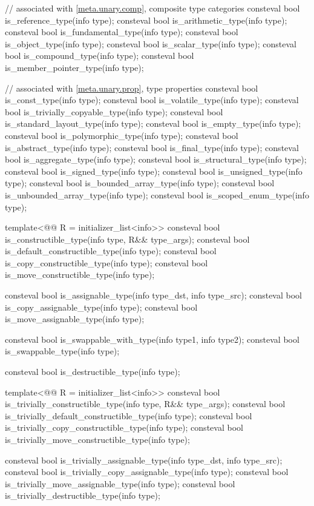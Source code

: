 \begin{codeblock}
{  // associated with \ref{meta.unary.comp}, composite type categories
  consteval bool is_reference_type(info type);
  consteval bool is_arithmetic_type(info type);
  consteval bool is_fundamental_type(info type);
  consteval bool is_object_type(info type);
  consteval bool is_scalar_type(info type);
  consteval bool is_compound_type(info type);
  consteval bool is_member_pointer_type(info type);

  // associated with \ref{meta.unary.prop}, type properties
  consteval bool is_const_type(info type);
  consteval bool is_volatile_type(info type);
  consteval bool is_trivially_copyable_type(info type);
  consteval bool is_standard_layout_type(info type);
  consteval bool is_empty_type(info type);
  consteval bool is_polymorphic_type(info type);
  consteval bool is_abstract_type(info type);
  consteval bool is_final_type(info type);
  consteval bool is_aggregate_type(info type);
  consteval bool is_structural_type(info type);
  consteval bool is_signed_type(info type);
  consteval bool is_unsigned_type(info type);
  consteval bool is_bounded_array_type(info type);
  consteval bool is_unbounded_array_type(info type);
  consteval bool is_scoped_enum_type(info type);

  template<@@ R = initializer_list<info>>
    consteval bool is_constructible_type(info type, R&& type_args);
  consteval bool is_default_constructible_type(info type);
  consteval bool is_copy_constructible_type(info type);
  consteval bool is_move_constructible_type(info type);

  consteval bool is_assignable_type(info type_dst, info type_src);
  consteval bool is_copy_assignable_type(info type);
  consteval bool is_move_assignable_type(info type);

  consteval bool is_swappable_with_type(info type1, info type2);
  consteval bool is_swappable_type(info type);

  consteval bool is_destructible_type(info type);

  template<@@ R = initializer_list<info>>
    consteval bool is_trivially_constructible_type(info type, R&& type_args);
  consteval bool is_trivially_default_constructible_type(info type);
  consteval bool is_trivially_copy_constructible_type(info type);
  consteval bool is_trivially_move_constructible_type(info type);

  consteval bool is_trivially_assignable_type(info type_dst, info type_src);
  consteval bool is_trivially_copy_assignable_type(info type);
  consteval bool is_trivially_move_assignable_type(info type);
  consteval bool is_trivially_destructible_type(info type);

}
\end{codeblock}
